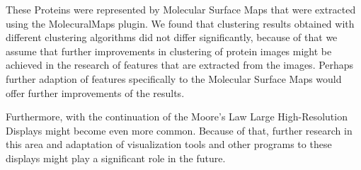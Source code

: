 \documentclass[journal]{vgtc}       %
\begin{document}
These Proteins were represented by Molecular Surface Maps that were extracted using the MolecuralMaps plugin.
We found that clustering results obtained with different clustering algorithms did not differ significantly, because of that we assume that further improvements in clustering of protein images might be achieved in the research of features that are extracted from the images. Perhaps further adaption of features specifically to the Molecular Surface Maps would offer further improvements of the results. 

Furthermore, with the continuation of the Moore's Law Large High-Resolution Displays might become even more common. Because of that, further research in this area and adaptation of visualization tools and other programs to these displays might play a significant role in the future.




\end{document}
